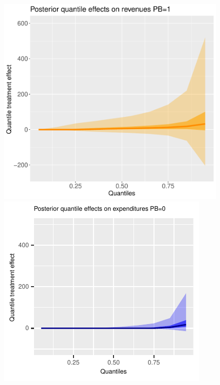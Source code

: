 \documentclass[AER]{AEA}
\begin{document}
\begin{figure}[h!]
    \includegraphics{posterior_parent_quantile_TEs_revenues_pb_1_lognormal.pdf}\\
    \includegraphics{posterior_parent_quantile_TEs_expenditures_pb_0_lognormal.pdf}

\end{figure}
\end{document}
